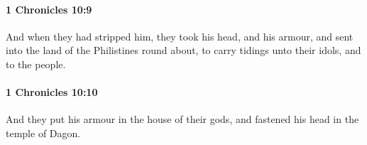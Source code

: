 		\paragraph{1 Chronicles 10:9} %
			\label{1CHRONICLES-10-9}

			And when they had stripped him, they took his head, and his armour, and sent into the land of the Philistines round about, to carry tidings unto their idols, and to the people.


		\paragraph{1 Chronicles 10:10} %
			\label{1CHRONICLES-10-10}

			And they put his armour in the house of their gods, and fastened his head in the temple of Dagon.


